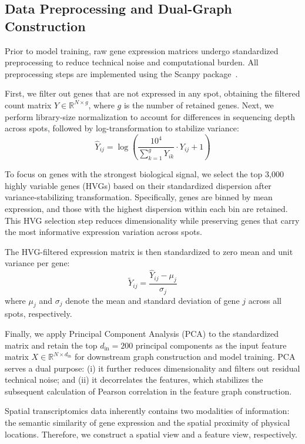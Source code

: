 \documentclass[lettersize,journal]{IEEEtran}
\begin{document}
\subsection{Data Preprocessing and Dual-Graph Construction}
Prior to model training, raw gene expression matrices undergo standardized preprocessing to reduce technical noise and computational burden. All preprocessing steps are implemented using the Scanpy package~\cite{wolf2018scanpy}.

First, we filter out genes that are not expressed in any spot, obtaining the filtered count matrix $Y \in \mathbb{R}^{N \times g}$, where $g$ is the number of retained genes. Next, we perform library-size normalization to account for differences in sequencing depth across spots, followed by log-transformation to stabilize variance:
\begin{equation}
    \hat{Y}_{ij} = \log \left( \frac{10^4}{\sum_{k=1}^{g} Y_{ik}} \cdot Y_{ij} + 1 \right)
\end{equation}

To focus on genes with the strongest biological signal, we select the top 3,000 highly variable genes (HVGs) based on their standardized dispersion after variance-stabilizing transformation. Specifically, genes are binned by mean expression, and those with the highest dispersion within each bin are retained. This HVG selection step reduces dimensionality while preserving genes that carry the most informative expression variation across spots.

The HVG-filtered expression matrix is then standardized to zero mean and unit variance per gene:
\begin{equation}
    \tilde{Y}_{ij} = \frac{\hat{Y}_{ij} - \mu_j}{\sigma_j}
\end{equation}
where $\mu_j$ and $\sigma_j$ denote the mean and standard deviation of gene $j$ across all spots, respectively.

Finally, we apply Principal Component Analysis (PCA) to the standardized matrix and retain the top $d_{\text{in}}=200$ principal components as the input feature matrix $X \in \mathbb{R}^{N \times d_{\text{in}}}$ for downstream graph construction and model training. PCA serves a dual purpose: (i) it further reduces dimensionality and filters out residual technical noise; and (ii) it decorrelates the features, which stabilizes the subsequent calculation of Pearson correlation in the feature graph construction.

Spatial transcriptomics data inherently contains two modalities of information: the semantic similarity of gene expression and the spatial proximity of physical locations. Therefore, we construct a spatial view and a feature view, respectively.
\end{document}
